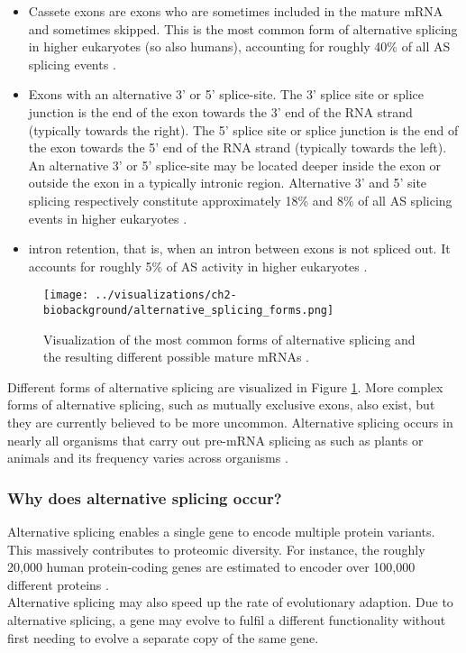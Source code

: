 \begin{itemize}
\item Cassete exons are exons who are sometimes included in the mature mRNA and sometimes skipped. This is the most common form of alternative splicing in higher eukaryotes (so also humans), accounting for roughly 40\% of all AS splicing events \cite{splicing_current_perspectives}.
\item Exons with an alternative 3' or 5' splice-site. The 3' splice site or splice junction is the end of the exon towards the 3' end of the RNA strand (typically towards the right). The 5' splice site or splice junction is the end of the exon towards the 5' end of the RNA strand (typically towards the left). An alternative 3' or 5' splice-site may be located deeper inside the exon or outside the exon in a typically intronic region. Alternative 3' and 5' site splicing respectively constitute approximately 18\% and 8\% of all AS splicing events in higher eukaryotes \cite{splicing_current_perspectives}. 
\item intron retention, that is, when an intron between exons is not spliced out. It accounts for roughly 5\% of AS activity in higher eukaryotes \cite{splicing_current_perspectives}.
\end{itemize}

\begin{figure}
	\centering\texttt{[image: ../visualizations/ch2-biobackground/alternative\_splicing\_forms.png]} 
	\caption[test]
	{Visualization of the most common forms of alternative splicing and the resulting different possible mature mRNAs \cite{img:altsplicingforms}.
}
	\label{fig:altsplicingforms}
\end{figure}
Different forms of alternative splicing are visualized in Figure \ref{fig:altsplicingforms}. More complex forms of alternative splicing, such as mutually exclusive exons, also exist, but they are currently believed to be more uncommon. Alternative splicing occurs in nearly all organisms that carry out pre-mRNA splicing as such as plants or animals and its frequency varies across organisms \cite{splicing_current_perspectives}. 
\subsubsection{Why does alternative splicing occur?}
Alternative splicing enables a single gene to encode multiple protein variants. This massively contributes to proteomic diversity. For instance, the roughly 20,000 human protein-coding genes are estimated to encoder over 100,000 different proteins \cite{splicing_current_perspectives}.\\ 
Alternative splicing may also speed up the rate of evolutionary adaption. Due to alternative splicing, a gene may evolve to fulfil a different functionality without first needing to evolve a separate copy of the same gene. \cite{bretschneiderphdthesis}
